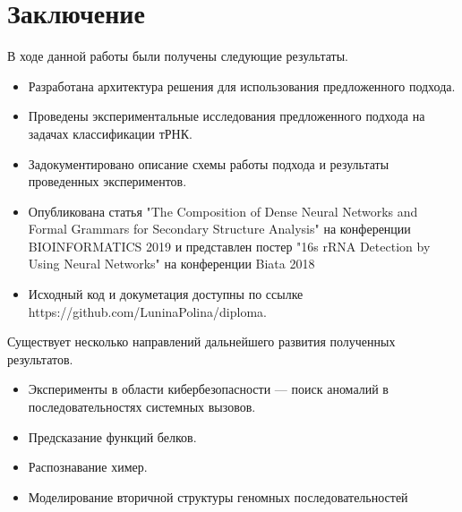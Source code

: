 \documentclass[14pt]{matmex-diploma-custom}
\begin{document}
\section*{Заключение}
В ходе данной работы были получены следующие результаты.
\begin{itemize}
    \item Разработана архитектура решения для использования предложенного подхода.
    \item Проведены экспериментальные исследования предложенного подхода на задачах классификации тРНК. 
    \item Задокументировано описание схемы работы подхода и результаты проведенных экспериментов.
    \item Опубликована статья "The Composition of Dense Neural Networks and Formal Grammars for Secondary Structure Analysis" на конференции BIOINFORMATICS 2019 и представлен постер "16s rRNA Detection by Using Neural Networks" на конференции Biata 2018
    \item Исходный код и докуметация доступны по ссылке https://github.com/LuninaPolina/diploma.
\end{itemize}


Существует несколько направлений дальнейшего развития полученных результатов.
\begin{itemize}
    \item Эксперименты в области кибербезопасности --- поиск аномалий в последовательностях системных вызовов.
    \item Предсказание функций белков.
    \item Распознавание химер.
    \item Моделирование вторичной структуры геномных последовательностей
\end{itemize}



\setmonofont[Mapping=tex-text]{CMU Typewriter Text}

\renewcommand\refname{Список литературы}

\end{document}
